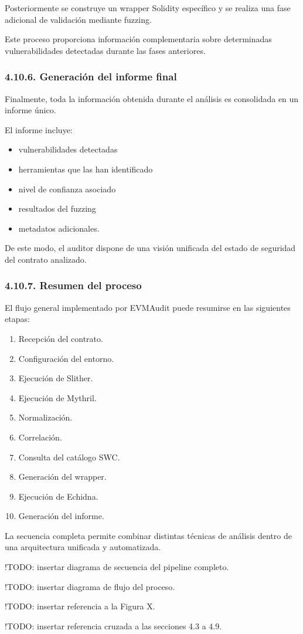 Posteriormente se construye un wrapper Solidity específico y se realiza
una fase adicional de validación mediante fuzzing.

Este proceso proporciona información complementaria sobre determinadas
vulnerabilidades detectadas durante las fases anteriores.

\subsubsection{4.10.6. Generación del informe
final}\label{generaciuxf3n-del-informe-final}

Finalmente, toda la información obtenida durante el análisis es
consolidada en un informe único.

El informe incluye:

\begin{itemize}
\tightlist
\item
  vulnerabilidades detectadas
\item
  herramientas que las han identificado
\item
  nivel de confianza asociado
\item
  resultados del fuzzing
\item
  metadatos adicionales.
\end{itemize}

De este modo, el auditor dispone de una visión unificada del estado de
seguridad del contrato analizado.

\subsubsection{4.10.7. Resumen del proceso}\label{resumen-del-proceso}

El flujo general implementado por EVMAudit puede resumirse en las
siguientes etapas:

\begin{enumerate}
\def\labelenumi{\arabic{enumi}.}
\tightlist
\item
  Recepción del contrato.
\item
  Configuración del entorno.
\item
  Ejecución de Slither.
\item
  Ejecución de Mythril.
\item
  Normalización.
\item
  Correlación.
\item
  Consulta del catálogo SWC.
\item
  Generación del wrapper.
\item
  Ejecución de Echidna.
\item
  Generación del informe.
\end{enumerate}

La secuencia completa permite combinar distintas técnicas de análisis
dentro de una arquitectura unificada y automatizada.

!TODO: insertar diagrama de secuencia del pipeline completo.

!TODO: insertar diagrama de flujo del proceso.

!TODO: insertar referencia a la Figura X.

!TODO: insertar referencia cruzada a las secciones 4.3 a 4.9.
